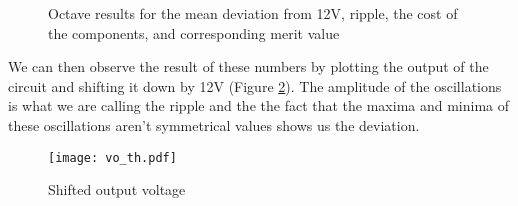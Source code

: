 \begin{figure}[h]
	\centering
	\scalebox{0.75}{
		
	}
	\caption{Octave results for the mean deviation from 12V, ripple, the cost of the components, and corresponding merit value}
	\label{fig:th_results}
\end{figure}

We can then observe the result of these numbers by plotting the output of the circuit and shifting it down by 12V (Figure \ref{fig:th_vo}). The amplitude of the oscillations is what we are calling the ripple and the the fact that the maxima and minima of these oscillations aren't symmetrical values shows us the deviation.


\begin{figure}[h]
	\centering
	\texttt{[image: vo\_th.pdf]}
	\caption{Shifted output voltage}
	\label{fig:th_vo}
\end{figure}
\newpage
\newpage

